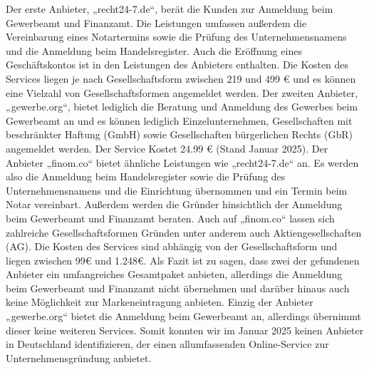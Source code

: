 Der erste Anbieter, „recht24-7.de“, berät die Kunden zur Anmeldung beim Gewerbeamt und Finanzamt. Die Leistungen umfassen außerdem die Vereinbarung eines Notartermins sowie die Prüfung des Unternehmensnamens und die Anmeldung beim Handelsregister. Auch die Eröffnung eines Geschäftskontos ist in den Leistungen des Anbieters enthalten. Die Kosten des Services liegen je nach Gesellschaftsform zwischen 219 und 499 € und es können eine Vielzahl von Gesellschaftsformen angemeldet werden. 
Der zweiten Anbieter, „gewerbe.org“, bietet lediglich die Beratung und Anmeldung des Gewerbes beim Gewerbeamt an und es können lediglich Einzelunternehmen, Gesellschaften mit beschränkter Haftung (GmbH) sowie Gesellschaften bürgerlichen Rechts (GbR) angemeldet werden. Der Service Kostet 24.99 € (Stand Januar 2025). 
Der Anbieter „finom.co“ bietet ähnliche Leistungen wie „recht24-7.de“ an. Es werden also die Anmeldung beim Handelsregister sowie die Prüfung des Unternehmensnamens und die Einrichtung übernommen und ein Termin beim Notar vereinbart. Außerdem werden die Gründer hinsichtlich der Anmeldung beim Gewerbeamt und Finanzamt beraten. Auch auf „finom.co“ lassen sich zahlreiche Gesellschaftsformen Gründen unter anderem auch Aktiengesellschaften (AG). Die Kosten des Services sind abhängig von der Gesellschaftsform und liegen zwischen 99€ und 1.248€. 
Als Fazit ist zu sagen, dass zwei der gefundenen Anbieter ein umfangreiches Gesamtpaket anbieten, allerdings die Anmeldung beim Gewerbeamt und Finanzamt nicht übernehmen und darüber hinaus auch keine Möglichkeit zur Markeneintragung anbieten. Einzig der Anbieter „gewerbe.org“ bietet die Anmeldung beim Gewerbeamt an, allerdings übernimmt dieser keine weiteren Services. Somit konnten wir im Januar 2025 keinen Anbieter in Deutschland identifizieren, der einen allumfassenden Online-Service zur Unternehmensgründung anbietet. 
